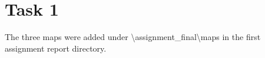 \section{Task 1}
The three maps were added under \textbackslash assignment\_final\textbackslash maps in the first assignment report directory.